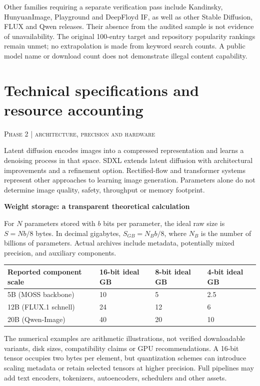 \documentclass[11pt,a4paper]{article}
\newcommand{\sect}[2]{\section{#1}\textcolor{muted}{\small\textsc{#2}}\par\vspace{2mm}}
\newcommand{\sub}[1]{\vspace{1mm}\textbf{#1}\par}
\begin{document}
Other families requiring a separate verification pass include Kandinsky, HunyuanImage, Playground and DeepFloyd IF, as well as other Stable Diffusion, FLUX and Qwen releases. Their absence from the audited sample is not evidence of unavailability. The original 100-entry target and repository popularity rankings remain unmet; no extrapolation is made from keyword search counts. A public model name or download count does not demonstrate illegal content capability.


\clearpage\sect{Technical specifications and resource accounting}{Phase 2 | architecture, precision and hardware}

Latent diffusion encodes images into a compressed representation and learns a denoising process in that space. SDXL extends latent diffusion with architectural improvements and a refinement option. Rectified-flow and transformer systems represent other approaches to learning image generation. Parameters alone do not determine image quality, safety, throughput or memory footprint. \cite{ldm,sdxl,flux}


\sub{Weight storage: a transparent theoretical calculation}

For $N$ parameters stored with $b$ bits per parameter, the ideal raw size is $S=N b/8$ bytes. In decimal gigabytes, $S_{GB}=N_{B}b/8$, where $N_B$ is the number of billions of parameters. Actual archives include metadata, potentially mixed precision, and auxiliary components.\par
\begin{center}\small\begin{tabularx}{\linewidth}{@{}YYYY@{}}\toprule
\textbf{Reported component scale} & \textbf{16-bit ideal GB} & \textbf{8-bit ideal GB} & \textbf{4-bit ideal GB}\\\midrule
5B (MOSS backbone) & 10 & 5 & 2.5\\
12B (FLUX.1 schnell) & 24 & 12 & 6\\
20B (Qwen-Image) & 40 & 20 & 10\\\bottomrule\end{tabularx}\end{center}

The numerical examples are arithmetic illustrations, not verified downloadable variants, disk sizes, compatibility claims or GPU recommendations. A 16-bit tensor occupies two bytes per element, but quantization schemes can introduce scaling metadata or retain selected tensors at higher precision. Full pipelines may add text encoders, tokenizers, autoencoders, schedulers and other assets. \cite{memory}
\end{document}
